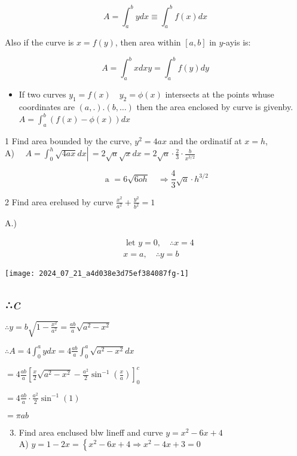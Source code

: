 \documentclass[12pt, a4paper]{article}
\begin{document}
$$
A=\int_{a}^{b} y d x \equiv \int_{a}^{b} f(x) d x
$$

Also if the curve is $x=f(y)$, then area within $[a, b]$ in $y$-ayis is:

$$
A=\int_{a}^{b} x d x y=\int_{a}^{b} f(y) d y
$$

\begin{itemize}
  \item If two curves $y_{1}=f(x) \quad y_{2}=\phi(x)$ intersects at the points whuse coordinates are $(a, .).(b, \ldots)$ then the area enclosed by curve is givenby. $A=\int_{a}^{b}(f(x)-\phi(x)) d x$
\end{itemize}

1 Find area bounded by the curve, $y^{2}=4 a x$ and the ordinatif at $x=h$,\\
A) $\quad A=\int_{0}^{h} \sqrt{4 a x} d x \left\lvert\,=2 \sqrt{a} \sqrt{x} d x=2 \sqrt{a} \cdot \frac{2}{3} \cdot \frac{b}{x^{3 / 2}}\right.$

$$
\text { a }=6 \sqrt{6 o h} \quad \Rightarrow \frac{4}{3} \sqrt{a} \cdot h^{3 / 2}
$$

2 Find area erelused by curve $\frac{x^{2}}{a^{2}}+\frac{y^{2}}{b^{2}}=1$

A.)

$$
\begin{aligned}
& \text { let } y=0, \quad \therefore x=4 \\
& x=a, \quad \therefore y=b
\end{aligned}
$$

\begin{center}
\texttt{[image: 2024\_07\_21\_a4d038e3d75ef384087fg-1]}
\end{center}

\section*{$\therefore c$ }
$\therefore y=b \sqrt{1-\frac{x^{2}}{a^{2}}}=\frac{a b}{a} \sqrt{a^{2}-x^{2}}$

$\therefore A=4 \int_{0}^{a} y d x=4 \frac{a b}{a} \int_{0}^{a} \sqrt{a^{2}-x^{2}} d x$

$=4 \frac{a b}{a}\left[\frac{x}{2} \sqrt{a^{2}-x^{2}}-\frac{a^{2}}{2} \sin ^{-1}\left(\frac{x}{a}\right)\right]_{0}^{c}$

$=4 \frac{a b}{a} \cdot \frac{a^{2}}{2} \sin ^{-1}(1)$

$=\pi a b$

\begin{enumerate}
  \setcounter{enumi}{2}
  \item Find area enclused blw lineff and curve $y=x^{2}-6 x+4$\\
A) $y=1-2 x=\left\{x^{2}-6 x+4 \Rightarrow x^{2}-4 x+3=0\right.$
\end{enumerate}
\end{document}
